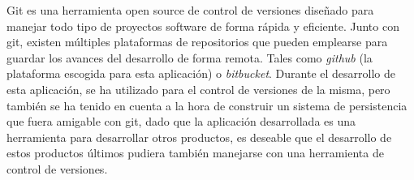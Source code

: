 Git\cite{git} es una herramienta open source de control de versiones diseñado para manejar todo tipo de proyectos software de forma rápida y eficiente.
Junto con git, existen múltiples plataformas de repositorios que pueden emplearse para guardar los avances del desarrollo de forma remota. Tales como \textit{github}\cite{github} (la plataforma escogida para esta aplicación) o \textit{bitbucket}\cite{bitbucket}.
Durante el desarrollo de esta aplicación, se ha utilizado para el control de versiones de la misma, pero también se ha tenido en cuenta a la hora de construir un sistema de persistencia que fuera amigable con git, dado que la aplicación desarrollada es una herramienta para desarrollar otros productos, es deseable que el desarrollo de estos productos últimos pudiera también manejarse con una herramienta de control de versiones.